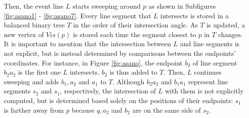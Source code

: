 Then, the event line $L$ starts sweeping around $p$ as shown in Subfigures \ref{fig:asano1} - \ref{fig:asano7}. Every line segment that $L$ intersects is stored in a balanced binary tree $T$ in the order of their intersection angle. As $T$ is updated, a new vertex of $Vis(p)$ is stored each time the segment closest to $p$ in $T$ changes. It is important to mention that the intersection between $L$ and line segments is not explicit, but is instead determined by comparisons between the endpoints' coordinates. For instance, in Figure \ref{fig:asano}, the endpoint $b_2$ of line segment $\overline{b_2a_2}$ is the first one $L$ intersects. $b_2$ is thus added to $T$. Then, $L$ continues sweeping and adds $b_1, a_2$ and $a_1$ to $T$. Although $\overline{b_2a_2}$ and $\overline{b_1a_1}$ represent line segments $s_2$ and $s_1$, respectively, the intersection of $L$ with them is not explicitly computed, but is determined based solely on the positions of their endpoints: $s_1$ is farther away from $p$ because $q, a_2$ and $b_2$ are on the same side of $s_2$.

